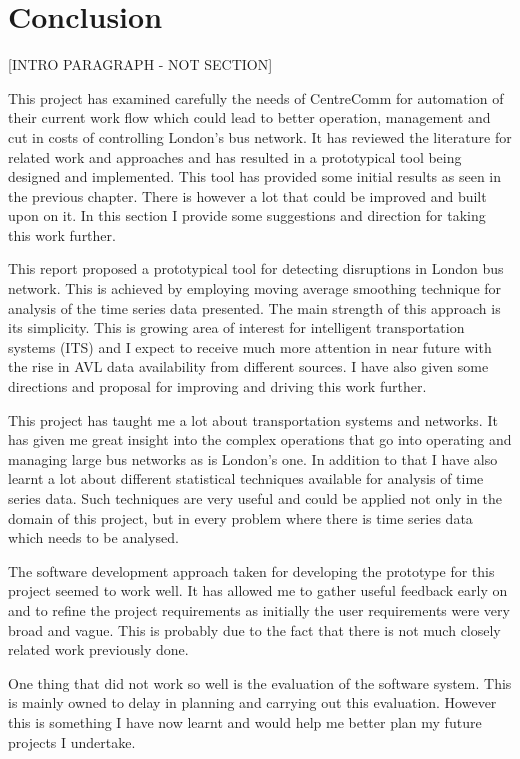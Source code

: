 \chapter{Conclusion}
[INTRO PARAGRAPH - NOT SECTION]

This project has examined carefully the needs of CentreComm for automation of their current work flow which could lead to better operation, management and cut in costs of controlling London's bus network. It has reviewed the literature for related work and approaches and has resulted in a prototypical tool being designed and implemented. This tool has provided some initial results as seen in the previous chapter. There is however a lot that could be improved and built upon on it. In this section I provide some suggestions and direction for taking this work further.

This report proposed a prototypical tool for detecting disruptions in London bus network. This is achieved by employing moving average smoothing technique for analysis of the time series data presented. The main strength of this approach is its simplicity. This is growing area of interest for intelligent transportation systems (ITS) and I expect to receive much more attention in near future with the rise in AVL data availability from different sources. I have also given some directions and proposal for improving and driving this work further.

This project has taught me a lot about transportation systems and networks. It has given me great insight into the complex operations that go into operating and managing large bus networks as is London's one. In addition to that I have also learnt a lot about different statistical techniques available for analysis of time series data. Such techniques are very useful and could be applied not only in the domain of this project, but in every problem where there is time series data which needs to be analysed. 

The software development approach taken for developing the prototype for this project seemed to work well. It has allowed me to gather useful feedback early on and to refine the project requirements as initially the user requirements were very broad and vague. This is probably due to the fact that there is not much closely related work previously done. 

One thing that did not work so well is the evaluation of the software system. This is mainly owned to delay in planning and carrying out this evaluation. However this is something I have now learnt and would help me better plan my future projects I undertake.

